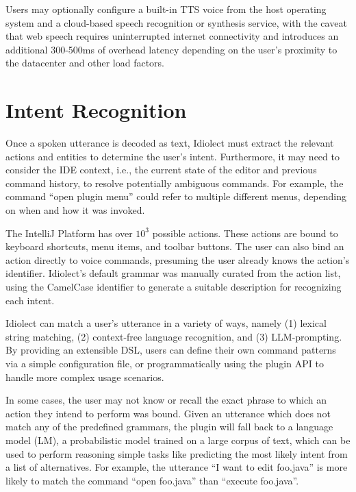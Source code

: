 \documentclass[conference]{IEEEtran}
\begin{document}

Users may optionally configure a built-in TTS voice from the host operating system and a cloud-based speech recognition or synthesis service, with the caveat that web speech requires uninterrupted internet connectivity and introduces an additional 300-500ms of overhead latency depending on the user's proximity to the datacenter and other load factors.

\section{Intent Recognition}

Once a spoken utterance is decoded as text, Idiolect must extract the relevant actions and entities to determine the user's intent. Furthermore, it may need to consider the IDE context, i.e., the current state of the editor and previous command history, to resolve potentially ambiguous commands. For example, the command ``open plugin menu'' could refer to multiple different menus, depending on when and how it was invoked.

The IntelliJ Platform has over $10^3$ possible actions. These actions are bound to keyboard shortcuts, menu items, and toolbar buttons. The user can also bind an action directly to voice commands, presuming the user already knows the action's identifier. Idiolect's default grammar was manually curated from the action list, using the CamelCase identifier to generate a suitable description for recognizing each intent.

Idiolect can match a user's utterance in a variety of ways, namely (1) lexical string matching, (2) context-free language recognition, and (3) LLM-prompting. By providing an extensible DSL, users can define their own command patterns via a simple configuration file, or programmatically using the plugin API to handle more complex usage scenarios.

In some cases, the user may not know or recall the exact phrase to which an action they intend to perform was bound. Given an utterance which does not match any of the predefined grammars, the plugin will fall back to a language model (LM), a probabilistic model trained on a large corpus of text, which can be used to perform reasoning simple tasks like predicting the most likely intent from a list of alternatives. For example, the utterance ``I want to edit foo.java'' is more likely to match the command ``open foo.java'' than ``execute foo.java''.
\end{document}
